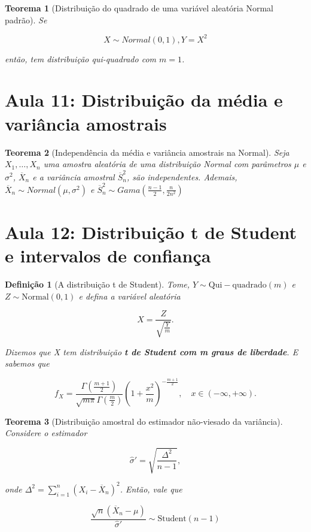 \documentclass{article}
\newtheorem{theorem}{Teorema}
\newtheorem{definition}{Definição}
\begin{document}
	\begin{theorem}[Distribuição do quadrado de uma variável aleatória Normal padrão]
		Se 
		
		$$X \sim Normal(0, 1), Y = X^2$$ 
		
		então, tem distribuição qui-quadrado com $m = 1$.
	\end{theorem}
	
	\section*{Aula 11: Distribuição da média e variância amostrais}
	\label{s11}
	\begin{theorem}[Independência da média e variância amostrais na Normal]
		Seja $X_1, \ldots, X_n$ uma amostra aleatória de uma distribuição Normal com parâmetros $\mu$ e $\sigma^2$, $\overline{X}_n$ e a variância amostral $\overline{S}_n^2$, são independentes. Ademais, $\overline{X}_n \sim Normal \left ( \mu, \sigma^2 \right )$ e $\overline{S}_n^2 \sim Gama \left ( \frac{n - 1}{2}, \frac{n}{2 n^2} \right )$
	\end{theorem}
	
	\section*{Aula 12: Distribuição t de Student  e intervalos de confiança}
	\label{s12}
	\begin{definition}[A distribuição t de Student]
		Tome, $Y \sim \mathrm{Qui-quadrado}(m)$ e $Z \sim \mathrm{Normal}(0, 1)$ e defina a variável aleatória
		
		$$X = \frac{Z}{\sqrt{\frac{Y}{m}}}.$$
		
		Dizemos que X tem distribuição \textbf{t de Student com m graus de liberdade}. E sabemos que
		
		$$f_X = \frac{\Gamma(\frac{m + 1}{2})}{\sqrt{m \pi} \Gamma(\frac{m}{2})} \left ( 1 + \frac{x^2}{m} \right )^{-\frac{m + 1}{2}}, \quad x \in (-\infty, + \infty).$$
	\end{definition}
	
	\begin{theorem}[Distribuição amostral do estimador não-viesado da variância]
		
		Considere o estimador
		
		$$\hat{\sigma}' = \sqrt{\frac{\Delta^2}{n - 1}},$$
		
		onde $\Delta^2 = \sum_{i = 1}^n (X_i - \overline{X}_n)^2$. Então, vale que
		
		$$\frac{\sqrt{n} (\overline{X}_n - \mu)}{\hat{\sigma}'} \sim \mathrm{Student}(n - 1)$$
	\end{theorem}
	
\end{document}

